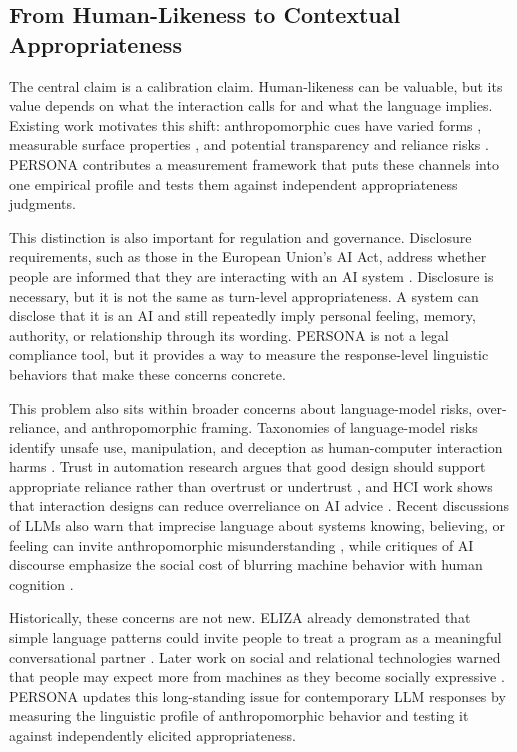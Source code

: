 \documentclass[manuscript,review,anonymous]{acmart}
\begin{document}
\subsection{From Human-Likeness to Contextual Appropriateness}
The central claim is a calibration claim. Human-likeness can be valuable, but its value depends on what the interaction calls for and what the language implies. Existing work motivates this shift: anthropomorphic cues have varied forms \cite{DeVrio2025Taxonomy}, measurable surface properties \cite{Cheng2025HumT}, and potential transparency and reliance risks \cite{Abercrombie2023Mirages,Leong2019Dishonest}. PERSONA contributes a measurement framework that puts these channels into one empirical profile and tests them against independent appropriateness judgments.

This distinction is also important for regulation and governance. Disclosure requirements, such as those in the European Union's AI Act, address whether people are informed that they are interacting with an AI system \cite{EUAIAct2024}. Disclosure is necessary, but it is not the same as turn-level appropriateness. A system can disclose that it is an AI and still repeatedly imply personal feeling, memory, authority, or relationship through its wording. PERSONA is not a legal compliance tool, but it provides a way to measure the response-level linguistic behaviors that make these concerns concrete.

This problem also sits within broader concerns about language-model risks, over-reliance, and anthropomorphic framing. Taxonomies of language-model risks identify unsafe use, manipulation, and deception as human-computer interaction harms \cite{Weidinger2022Risks}. Trust in automation research argues that good design should support appropriate reliance rather than overtrust or undertrust \cite{LeeSee2004Trust}, and HCI work shows that interaction designs can reduce overreliance on AI advice \cite{Bucinca2021CognitiveForcing}. Recent discussions of LLMs also warn that imprecise language about systems knowing, believing, or feeling can invite anthropomorphic misunderstanding \cite{Shanahan2024Talking}, while critiques of AI discourse emphasize the social cost of blurring machine behavior with human cognition \cite{Bender2024Dehumanization}.

Historically, these concerns are not new. ELIZA already demonstrated that simple language patterns could invite people to treat a program as a meaningful conversational partner \cite{Weizenbaum1966ELIZA}. Later work on social and relational technologies warned that people may expect more from machines as they become socially expressive \cite{Turkle2011AloneTogether}. PERSONA updates this long-standing issue for contemporary LLM responses by measuring the linguistic profile of anthropomorphic behavior and testing it against independently elicited appropriateness.
\end{document}
